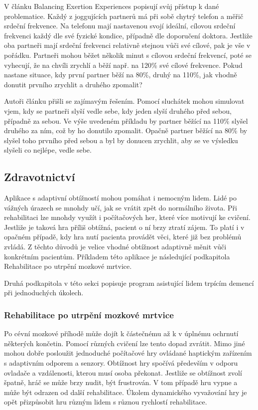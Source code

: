 V článku Balancing Exertion Experiences \cite{7} popisují svůj přístup k dané problematice. Každý z joggujících partnerů má při sobě chytrý telefon a měřič srdeční frekvence. Na telefonu mají nastavenou svojí ideální, cílovou srdeční frekvenci každý dle své fyzické kondice, případně dle doporučení doktora. Jestliže oba partneři mají srdeční frekvenci relativně stejnou vůči své cílové, pak je vše v pořádku. Partneři mohou běžet několik minut s cílovou srdeční frekvencí, poté se vyhecují, že na chvíli zrychlí a běží např. na 120\% své cílové frekvence. Pokud nastane situace, kdy první partner běží na 80\%, druhý na 110\%, jak vhodně donutit prvního zrychlit a druhého zpomalit? 

Autoři článku přišli se zajímavým řešením. Pomocí sluchátek mohou simulovat vjem, kdy se partneři slyší vedle sebe, kdy jeden slyší druhého před sebou, případně za sebou. Ve výše uvedeném příkladu by partner běžící na 110\% slyšel druhého za ním, což by ho donutilo zpomalit. Opačně partner běžící na 80\% by slyšel toho prvního před sebou a byl by donucen zrychlit, aby se ve výsledku slyšeli co nejlépe, vedle sebe.

\subsection{Zdravotnictví}

Aplikace s adaptivní obtížností mohou pomáhat i nemocným lidem. Lidé po vážných úrazech se mnohdy učí, jak se vrátit zpět do normálního života. Při rehabilitaci lze mnohdy využít i počítačových her, které více motivují ke cvičení. Jestliže je taková hra příliš obtížná, pacient o ní brzy ztratí zájem. To platí i v opačném případě, kdy hra nutí pacienta provádět věci, které již bez problémů zvládá. Z těchto důvodů je velice vhodné obtížnost adaptivně měnit vůči konkrétním pacientům. Příkladem této aplikace je následující podkapitola Rehabilitace po utrpění mozkové mrtvice.

Druhá podkapitola v této sekci popisuje program asistující lidem trpícím demencí při jednoduchých úkolech.

\subsubsection{Rehabilitace po utrpění mozkové mrtvice}

Po cévní mozkové příhodě může dojít k částečnému až k v úplnému ochrnutí některých končetin. Pomocí různých cvičení lze tento dopad zvrátit. Mimo jiné mohou dobře posloužit jednoduché počítačové hry ovládané haptickým zařízením s adaptivním odporem a senzory. Obtížnost hry spočívá především v odporu ovladače a vzdálenosti, kterou musí osoba překonat. Jestliže se obtížnost zvolí špatně, hráč se může brzy nudit, být frustrován. V tom případě hru vypne a může být odrazen od další rehabilitace. Úkolem dynamického vyvažování hry je opět přizpůsobit hru různým lidem s různou rychlostí rehabilitace\cite{9Pomdp}.  


